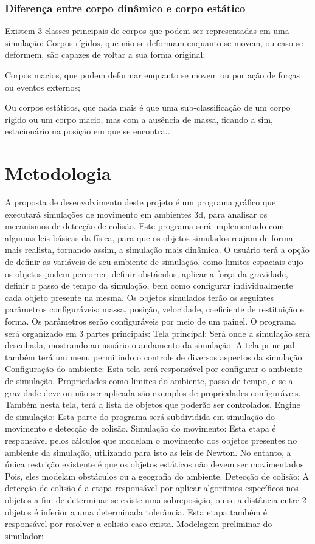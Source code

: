 \subsubsection{ Diferença entre corpo dinâmico e corpo estático}

Existem 3 classes principais de corpos que podem ser representadas em uma simulação:
Corpos rígidos, que não se deformam  enquanto se movem, ou caso se deformem, são capazes de voltar a sua forma original;


Corpos macios, que podem deformar enquanto se movem ou por ação de forças ou eventos externos;

Ou corpos estáticos, que nada mais é que uma sub-classificação de um corpo rígido ou um corpo macio,  mas com a ausência de massa, ficando a sim, estacionário na posição em que se
encontra...


\section{Metodologia}

A  proposta de desenvolvimento deste projeto é um programa gráfico que
executará simulações de movimento em ambientes 3d, para analisar os mecanismos de detecção de colisão.
Este programa será implementado com algumas leis básicas da física, para que os objetos simulados reajam de forma mais realista,  tornando assim, a simulação mais dinâmica.
O usuário terá a opção de definir as variáveis de seu ambiente de simulação, como limites espaciais cujo os objetos podem percorrer, definir obstáculos, aplicar a força da gravidade,
definir o passo de tempo da simulação, bem como configurar individualmente cada
objeto presente na mesma.
Os objetos simulados terão os seguintes parâmetros configuráveis: massa,
posição, velocidade, coeficiente de restituição e forma. Os parâmetros serão configuráveis por meio de um painel.
O programa será organizado em 3 partes principais:
Tela principal:
Será onde a simulação será desenhada, mostrando ao usuário o andamento da simulação.
A tela principal também terá um menu permitindo o controle de diversos aspectos da simulação.
Configuração do ambiente:
Esta tela será responsável por configurar o ambiente de simulação. Propriedades
como limites do ambiente, passo de tempo, e se a gravidade deve ou não ser
aplicada são exemplos de propriedades configuráveis.
Também nesta tela, terá a lista de objetos que poderão ser controlados.
Engine de simulação:
Esta parte do programa será subdividida em simulação do movimento e detecção de colisão.
Simulação do movimento:
Esta etapa é responsável pelos cálculos que modelam o movimento dos objetos presentes no ambiente da simulação, utilizando para isto as leis de Newton.
No entanto, a  única restrição existente é que os objetos estáticos não devem ser movimentados. Pois, eles modelam obstáculos ou a geografia do ambiente.
Detecção de colisão:
A detecção de colisão é a etapa responsável por aplicar algoritmos específicos nos objetos a fim de determinar se existe uma sobreposição, ou se  a distância entre 2 objetos é inferior a uma determinada tolerância.
Esta etapa também é responsável por resolver a colisão caso exista.
Modelagem preliminar do simulador:


